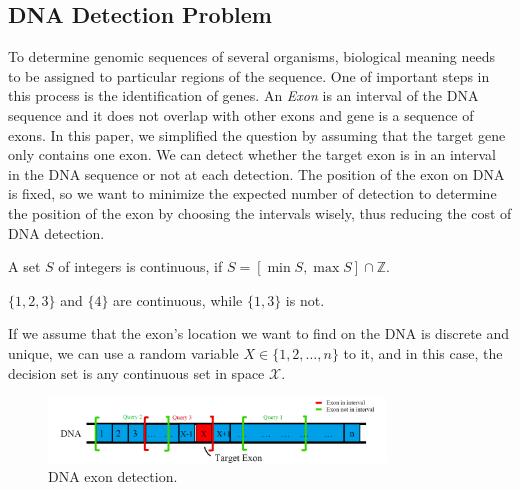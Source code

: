 \subsection{DNA Detection Problem}
To determine genomic sequences of several organisms, biological meaning needs to be assigned to particular regions of the sequence. One of important steps in this process is the identification of genes. An \textit{Exon} is an interval of the DNA sequence and it does not overlap with other exons and gene is a sequence of exons. In this paper, we simplified the question by assuming that the target gene only contains one exon. We can detect whether the target exon is in an interval in the DNA sequence or not at each detection. The position of the exon on DNA is fixed, so we want to minimize the expected number of detection to determine the position of the exon by choosing the intervals wisely, thus reducing the cost of DNA detection\cite{biedl2004finding}\cite{xu1998gene}.

\begin{definition}
A set $S$ of integers is continuous, if $S = [\min S, \max S] \cap \mathbb{Z}$.
\end{definition}

\begin{example}
$\{1,2,3\}$ and $\{4\}$ are continuous, while $\{1,3\}$ is not.
\end{example}

If we assume that the exon's location we want to find on the DNA is discrete and unique, we can use a random variable $X\in \{1,2,\dots, n\}$ to it, and in this case, the decision set is any continuous set in space $\mathcal{X}$.

\begin{figure}
    \centering
    \includegraphics[width=0.8\textwidth]{figure/Exon.png}
    \caption{DNA exon detection.}
    \label{fig:exon}
\end{figure}

